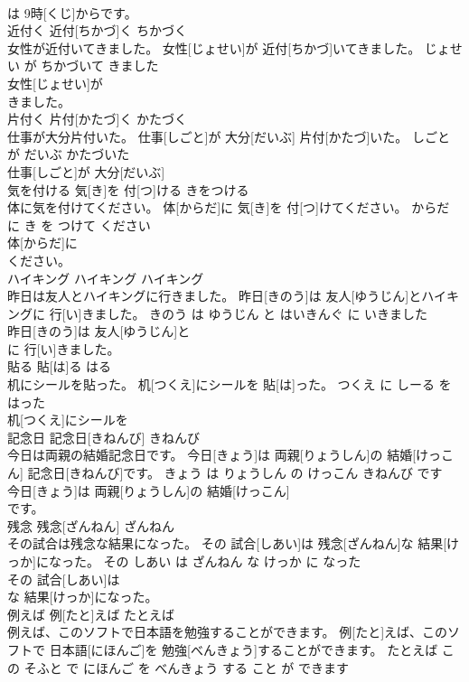 \documentclass[8pt]{extreport}
\begin{document}
\begin{CJK}{UTF8}{min}
\\	は 9時[くじ]からです。			
\\	近付く	近付[ちかづ]く	ちかづく	
\\	女性が近付いてきました。	女性[じょせい]が 近付[ちかづ]いてきました。	じょせい が ちかづいて きました	
\\	女性[じょせい]が
\\	きました。			
\\	片付く	片付[かたづ]く	かたづく	
\\	仕事が大分片付いた。	仕事[しごと]が 大分[だいぶ] 片付[かたづ]いた。	しごと が だいぶ かたづいた	
\\	仕事[しごと]が 大分[だいぶ]
\\	気を付ける	気[き]を 付[つ]ける	きをつける	
\\	体に気を付けてください。	体[からだ]に 気[き]を 付[つ]けてください。	からだ に き を つけて ください	
\\	体[からだ]に
\\	ください。			
\\	ハイキング	ハイキング	ハイキング	
\\	昨日は友人とハイキングに行きました。	昨日[きのう]は 友人[ゆうじん]とハイキングに 行[い]きました。	きのう は ゆうじん と はいきんぐ に いきました	
\\	昨日[きのう]は 友人[ゆうじん]と
\\	に 行[い]きました。			
\\	貼る	貼[は]る	はる	
\\	机にシールを貼った。	机[つくえ]にシールを 貼[は]った。	つくえ に しーる を はった	
\\	机[つくえ]にシールを
\\	記念日	記念日[きねんび]	きねんび	
\\	今日は両親の結婚記念日です。	今日[きょう]は 両親[りょうしん]の 結婚[けっこん] 記念日[きねんび]です。	きょう は りょうしん の けっこん きねんび です	
\\	今日[きょう]は 両親[りょうしん]の 結婚[けっこん]
\\	です。			
\\	残念	残念[ざんねん]	ざんねん	
\\	その試合は残念な結果になった。	その 試合[しあい]は 残念[ざんねん]な 結果[けっか]になった。	その しあい は ざんねん な けっか に なった	
\\	その 試合[しあい]は
\\	な 結果[けっか]になった。			
\\	例えば	例[たと]えば	たとえば	
\\	例えば、このソフトで日本語を勉強することができます。	例[たと]えば、このソフトで 日本語[にほんご]を 勉強[べんきょう]することができます。	たとえば この そふと で にほんご を べんきょう する こと が できます	

\end{CJK}
\end{document}
